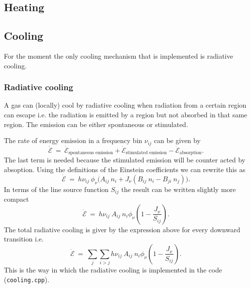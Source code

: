 \documentclass[]{article}
\begin{document}
\subsection{Heating}



\subsection{Cooling}

For the moment the only cooling mechanism that is implemented is radiative cooling.

\subsubsection{Radiative cooling}

A gas can (locally) cool by radiative cooling when radiation from a certain region can escape i.e. the radiation is emitted by a region but not absorbed in that same region. The emission can be either spontaneous or stimulated.

\bigskip

The rate of energy emission in a frequency bin $\nu_{ij}$ can be given by
\begin{equation}
\dot{\mathcal{E}} \ = \ \dot{\mathcal{E}}_{\text{spontaneous emission}} + \dot{\mathcal{E}}_{\text{stimulated emission}} - \dot{\mathcal{E}}_{\text{absorption}} .
\end{equation}
The last term is needed because the stimulated emission will be counter acted by absoption. Using the definitions of the Einstein coefficients we can rewrite this as
\begin{equation}
\dot{\mathcal{E}} \ = \ h\nu_{ij} \ \phi_{\nu} \Big( A_{ij} \ n_{i}  + J_{\nu} \left( B_{ij} \ n_{i} - B_{ji} \ n_{j} \right) \Big).
\end{equation}
In terms of the line source function $S_{ij}$ the result can be written slightly more compact
\begin{equation}
\dot{\mathcal{E}} \ = \ h\nu_{ij} \ A_{ij} \ n_{i}  \phi_{\nu} \left( 1  - \frac{J_{\nu}}{S_{ij}} \right).
\end{equation}
The total radiative cooling is giver by the expression above for every downward transition i.e.
\begin{equation}
\dot{\mathcal{E}} \ = \ \sum_{j} \sum_{i>j} h\nu_{ij} \ A_{ij} \ n_{i}  \phi_{\nu} \left( 1  - \frac{J_{\nu}}{S_{ij}} \right).
\end{equation}
This is the way in which the radiative cooling is implemented in the code (\texttt{cooling.cpp}).


\newpage



\end{document}
